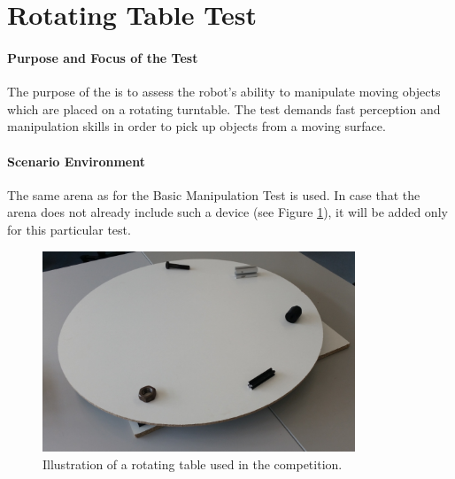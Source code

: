 \newpage
\section{Rotating Table Test}

\paragraph{Purpose and Focus of the Test}
The purpose of the  is to assess the robot's ability to manipulate moving objects which are placed on a  rotating turntable. The test demands fast perception and manipulation skills in order to pick up objects from a moving surface.

\paragraph{Scenario Environment}
The same arena as for the Basic Manipulation Test is used. In case that the arena does not already include such a device (see Figure \ref{fig:conveyor_belt}), it will be added only for this particular test.

\begin{figure} [h!]
	\begin{center}
		\includegraphics[height = 6cm]{./images/rotating_table.jpg}
	\end{center}
	\caption{Illustration of a rotating table used in the competition.}
	\label{fig:conveyor_belt}
\end{figure}



